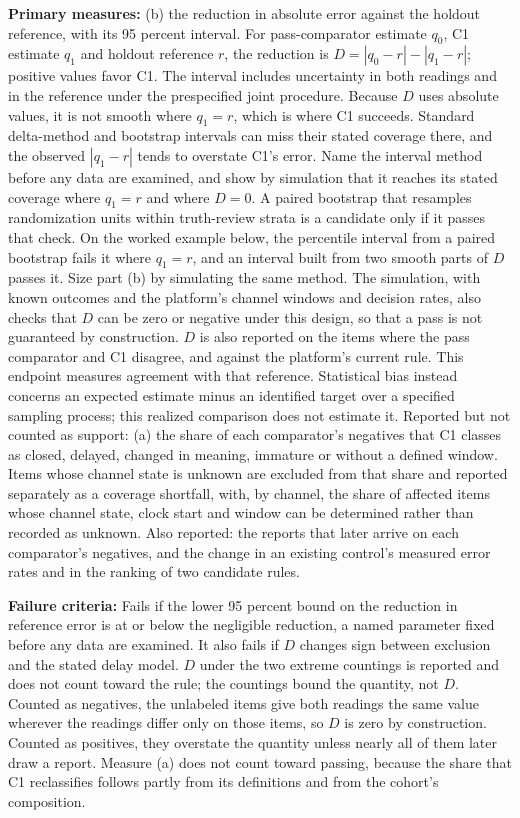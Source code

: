 \documentclass[
  11pt,
]{article}
\begin{document}
\textbf{Primary measures:} (b) the reduction in absolute error against
the holdout reference, with its 95 percent interval. For pass-comparator
estimate \(q_0\), C1 estimate \(q_1\) and holdout reference \(r\), the
reduction is \(D=|q_0-r|-|q_1-r|\); positive values favor C1. The
interval includes uncertainty in both readings and in the reference
under the prespecified joint procedure. Because \(D\) uses absolute
values, it is not smooth where \(q_1=r\), which is where C1 succeeds.
Standard delta-method and bootstrap intervals can miss their stated
coverage there, and the observed \(|q_1-r|\) tends to overstate C1's
error. Name the interval method before any data are examined, and show
by simulation that it reaches its stated coverage where \(q_1=r\) and
where \(D=0\). A paired bootstrap that resamples randomization units
within truth-review strata is a candidate only if it passes that check.
On the worked example below, the percentile interval from a paired
bootstrap fails it where \(q_1=r\), and an interval built from two
smooth parts of \(D\) passes it. Size part (b) by simulating the same
method. The simulation, with known outcomes and the platform's channel
windows and decision rates, also checks that \(D\) can be zero or
negative under this design, so that a pass is not guaranteed by
construction. \(D\) is also reported on the items where the pass
comparator and C1 disagree, and against the platform's current rule.
This endpoint measures agreement with that reference. Statistical bias
instead concerns an expected estimate minus an identified target over a
specified sampling process; this realized comparison does not estimate
it. Reported but not counted as support: (a) the share of each
comparator's negatives that C1 classes as closed, delayed, changed in
meaning, immature or without a defined window. Items whose channel state
is unknown are excluded from that share and reported separately as a
coverage shortfall, with, by channel, the share of affected items whose
channel state, clock start and window can be determined rather than
recorded as unknown. Also reported: the reports that later arrive on
each comparator's negatives, and the change in an existing control's
measured error rates and in the ranking of two candidate rules.

\textbf{Failure criteria:} Fails if the lower 95 percent bound on the
reduction in reference error is at or below the negligible reduction, a
named parameter fixed before any data are examined. It also fails if
\(D\) changes sign between exclusion and the stated delay model. \(D\)
under the two extreme countings is reported and does not count toward
the rule; the countings bound the quantity, not \(D\). Counted as
negatives, the unlabeled items give both readings the same value
wherever the readings differ only on those items, so \(D\) is zero by
construction. Counted as positives, they overstate the quantity unless
nearly all of them later draw a report. Measure (a) does not count
toward passing, because the share that C1 reclassifies follows partly
from its definitions and from the cohort's composition.
\end{document}
